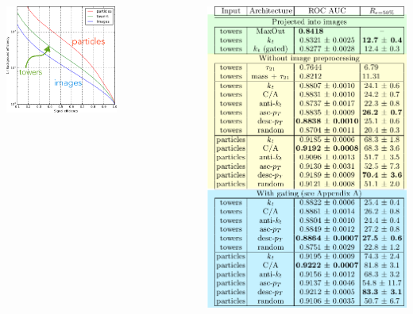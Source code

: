 \documentclass{beamer}
\begin{document}
\begin{frame}
\begin{columns}
\begin{column}{0.65\textwidth}
            \centering
            \includegraphics[width=0.6\textwidth]{figures/plot.png}
        \end{column}
        \begin{column}{0.35\textwidth}
            \centering
            \includegraphics[width=1.1\textwidth]{figures/table.png}
        \end{column}
    \end{columns}
\end{frame}
\end{document}
